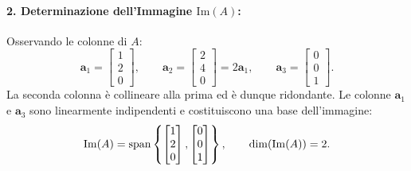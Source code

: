 \begin{example}
\paragraph{2. Determinazione dell'Immagine $\mathrm{Im}(A)$:}
Osservando le colonne di $A$:
\begin{equation}
    \mathbf{a}_1 = \begin{bmatrix} 1 \\ 2 \\ 0 \end{bmatrix}, \qquad \mathbf{a}_2 = \begin{bmatrix} 2 \\ 4 \\ 0 \end{bmatrix} = 2\mathbf{a}_1, \qquad \mathbf{a}_3 = \begin{bmatrix} 0 \\ 0 \\ 1 \end{bmatrix}.
\end{equation}
La seconda colonna \`e collineare alla prima ed \`e dunque ridondante. Le colonne $\mathbf{a}_1$ e $\mathbf{a}_3$ sono linearmente indipendenti e costituiscono una base dell'immagine:
\begin{equation}
    \mathrm{Im}(A) = \operatorname{span}\left\{ \begin{bmatrix} 1 \\ 2 \\ 0 \end{bmatrix}, \begin{bmatrix} 0 \\ 0 \\ 1 \end{bmatrix} \right\}, \qquad \dim(\mathrm{Im}(A)) = 2.
\end{equation}


\end{example}
